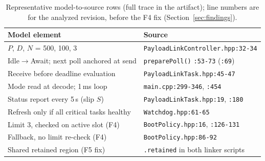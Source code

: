 \documentclass[conference,a4paper]{IEEEtran}
\begin{document}
\begin{table}[t]
\centering\footnotesize
\caption{Representative model-to-source rows (full trace in the artifact); line numbers are for the analyzed revision, before the F4 fix (Section~\ref{sec:findings}).}
\label{tab:trace}
\setlength{\tabcolsep}{3.5pt}
\begin{tabularx}{\columnwidth}{@{}>{\raggedright\arraybackslash}X l@{}}
\toprule
Model element & Source \\
\midrule
$P$, $D$, $N$ = 500, 100, 3 & \texttt{PayloadLinkController.hpp:32-34} \\
Idle$\to$Await; next poll anchored at send & \texttt{preparePoll()} \texttt{:53-73} (\texttt{:69}) \\
Receive before deadline evaluation & \texttt{PayloadLinkTask.hpp:45-47} \\
Mode read at decode; 1\,ms loop & \texttt{main.cpp:299-346}, \texttt{:454} \\
Status report every 5\,s (slip $S$) & \texttt{PayloadLinkTask.hpp:19}, \texttt{:180} \\
Refresh only if all critical tasks healthy & \texttt{Watchdog.hpp:61-65} \\
Limit 3, checked on active slot (F4) & \texttt{BootPolicy.hpp:16}, \texttt{:126-131} \\
Fallback, no limit re-check (F4) & \texttt{BootPolicy.hpp:86-92} \\
Shared retained region (F5 fix) & \texttt{.retained} in both linker scripts \\
\bottomrule
\end{tabularx}
\end{table}
\end{document}

